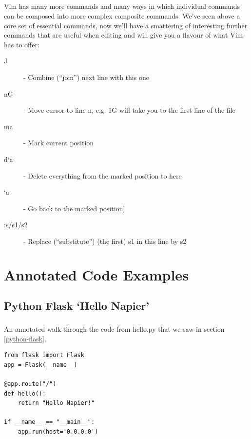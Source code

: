 \documentclass[12pt, a4paper, twoside]{book}
\begin{document}
\paragraph{} Vim has many more commands and many ways in which individual commands can be composed into more complex composite commands. We've seen above a core set of essential commands, now we'll have a smattering of interesting further commands that are useful when editing and will give you a flavour of what Vim has to offer:
\begin{description}
\item[J] - Combine (``join'') next line with this one
\item[nG] - Move cursor to line n, e.g. 1G will take you to the first line of the file
\item[ma] - Mark current position
\item[d`a] - Delete everything from the marked position to here
\item[`a] -  Go back to the marked position] 
\item[:s/s1/s2] - Replace (``substitute'') (the first) s1 in this line by s2
\end{description}


\chapter{Annotated Code Examples}
\label{annotated}

\section{Python Flask `Hello Napier'}
\label{annotated_hello_napier}
\paragraph{} An annotated walk through the code from hello.py that we saw in section \ref{python-flask}.

\begin{lstlisting}
from flask import Flask 
app = Flask(__name__)

@app.route("/")
def hello():
    return "Hello Napier!"

if __name__ == "__main__":
    app.run(host='0.0.0.0')

\end{lstlisting}
\end{document}
